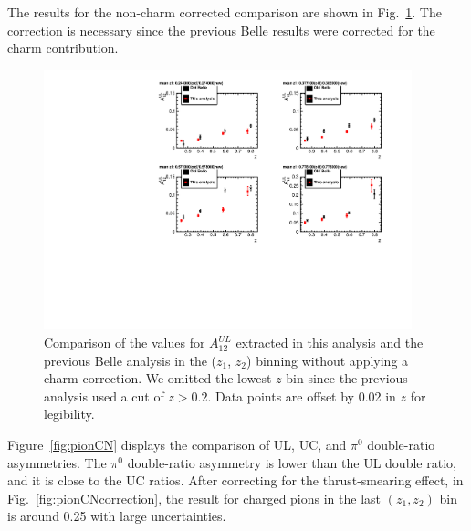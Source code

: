 The results for the non-charm corrected comparison are shown in Fig.~\ref{fig:belleComp}. 
The correction is necessary since the previous Belle results were corrected for the charm contribution.
\begin{figure}[t]
\includegraphics[width=0.95\textwidth]{figure_asy/BelleCompZ25.pdf}
\caption[Comparison of the values for $A^{UL}_{12}$ extracted in this analysis without charm correction and the previous Belle analysis in the ($z_1$, $z_2$) binning]{\label{fig:belleComp} Comparison of the values for $A^{UL}_{12}$ extracted in this analysis and the previous Belle analysis in the ($z_1$, $z_2$) binning without applying a charm correction. We omitted the lowest $z$ bin since the previous analysis used a cut of $z>0.2$. Data points are offset by 0.02 in $z$ for legibility.}
\end{figure}

Figure~\ref{fig:pionCN} displays the comparison of UL, UC, and $\pi^0$ double-ratio asymmetries. The $\pi^0$ double-ratio asymmetry is lower than the UL double ratio, and it is close to the UC ratios. After correcting for the thrust-smearing effect, in Fig.~\ref{fig:pionCNcorrection}, the result for charged pions in the last $(z_1,z_2)$ bin is around 0.25 with large uncertainties. 

